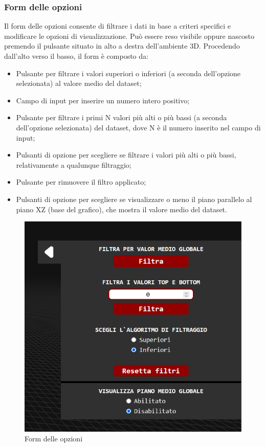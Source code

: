 \subsubsection{Form delle opzioni}
Il form delle opzioni consente di filtrare i dati in base a criteri specifici e
modificare le opzioni di visualizzazione. Può essere reso visibile oppure
nascosto premendo il pulsante situato in alto a destra dell'ambiente 3D.
Procedendo dall'alto verso il basso, il form è composto da:
\begin{itemize}
    \item Pulsante per filtrare i valori superiori o inferiori (a seconda dell'opzione
          selezionata) al valore medio del dataset;
    \item Campo di input per inserire un numero intero positivo;
    \item Pulsante per filtrare i primi N valori più alti o più bassi (a seconda
          dell'opzione selezionata) del dataset, dove N è il numero inserito nel campo di
          input;
    \item Pulsanti di opzione per scegliere se filtrare i valori più alti o più bassi,
          relativamente a qualunque filtraggio;
    \item Pulsante per rimuovere il filtro applicato;
    \item Pulsanti di opzione per scegliere se visualizzare o meno il piano parallelo al
          piano XZ (base del grafico), che mostra il valore medio del dataset.
\end{itemize}
\begin{figure}[ht!]
    \centering
    \includegraphics[scale=0.6]{template/images/options.png}
    \caption{Form delle opzioni}
\end{figure}

